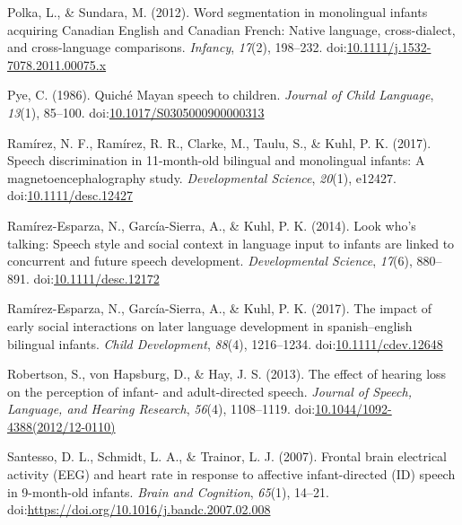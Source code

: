 \documentclass[,man,floatsintext]{apa6}
\begin{document}
\leavevmode\hypertarget{ref-polka_2012}{}%
Polka, L., \& Sundara, M. (2012). Word segmentation in monolingual infants acquiring Canadian English and Canadian French: Native language, cross-dialect, and cross-language comparisons. \emph{Infancy}, \emph{17}(2), 198--232. doi:\href{https://doi.org/10.1111/j.1532-7078.2011.00075.x}{10.1111/j.1532-7078.2011.00075.x}

\leavevmode\hypertarget{ref-pye_1986}{}%
Pye, C. (1986). Quiché Mayan speech to children. \emph{Journal of Child Language}, \emph{13}(1), 85--100. doi:\href{https://doi.org/10.1017/S0305000900000313}{10.1017/S0305000900000313}

\leavevmode\hypertarget{ref-ramirez_2017}{}%
Ramírez, N. F., Ramírez, R. R., Clarke, M., Taulu, S., \& Kuhl, P. K. (2017). Speech discrimination in 11-month-old bilingual and monolingual infants: A magnetoencephalography study. \emph{Developmental Science}, \emph{20}(1), e12427. doi:\href{https://doi.org/10.1111/desc.12427}{10.1111/desc.12427}

\leavevmode\hypertarget{ref-ramirez_esparza_2014}{}%
Ramírez-Esparza, N., García-Sierra, A., \& Kuhl, P. K. (2014). Look who's talking: Speech style and social context in language input to infants are linked to concurrent and future speech development. \emph{Developmental Science}, \emph{17}(6), 880--891. doi:\href{https://doi.org/10.1111/desc.12172}{10.1111/desc.12172}

\leavevmode\hypertarget{ref-ramirez_esparza_2017}{}%
Ramírez-Esparza, N., García-Sierra, A., \& Kuhl, P. K. (2017). The impact of early social interactions on later language development in spanish--english bilingual infants. \emph{Child Development}, \emph{88}(4), 1216--1234. doi:\href{https://doi.org/10.1111/cdev.12648}{10.1111/cdev.12648}

\leavevmode\hypertarget{ref-robertson_2013}{}%
Robertson, S., von Hapsburg, D., \& Hay, J. S. (2013). The effect of hearing loss on the perception of infant- and adult-directed speech. \emph{Journal of Speech, Language, and Hearing Research}, \emph{56}(4), 1108--1119. doi:\href{https://doi.org/10.1044/1092-4388(2012/12-0110)}{10.1044/1092-4388(2012/12-0110)}

\leavevmode\hypertarget{ref-santesso_2007}{}%
Santesso, D. L., Schmidt, L. A., \& Trainor, L. J. (2007). Frontal brain electrical activity (EEG) and heart rate in response to affective infant-directed (ID) speech in 9-month-old infants. \emph{Brain and Cognition}, \emph{65}(1), 14--21. doi:\href{https://doi.org/https://doi.org/10.1016/j.bandc.2007.02.008}{https://doi.org/10.1016/j.bandc.2007.02.008}
\end{document}
